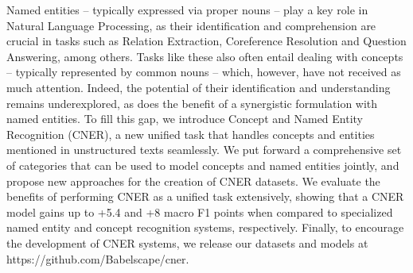 Named entities -- typically expressed via proper nouns -- play a key role in Natural Language Processing, as their identification and comprehension are crucial in tasks such as Relation Extraction, Coreference Resolution and Question Answering, among others. Tasks like these also often entail dealing with concepts -- typically represented by common nouns -- which, however, have not received as much attention. Indeed, the potential of their identification and understanding remains underexplored, as does the benefit of a synergistic formulation with named entities. To fill this gap, we introduce Concept and Named Entity Recognition (CNER), a new unified task that handles concepts and entities mentioned in unstructured texts seamlessly. We put forward a comprehensive set of categories that can be used to model concepts and named entities jointly, and propose new approaches for the creation of CNER datasets. We evaluate the benefits of performing CNER as a unified task extensively, showing that a CNER model gains up to +5.4 and +8 macro F1 points when compared to specialized named entity and concept recognition systems, respectively. Finally, to encourage the development of CNER systems, we release our datasets and models at https://github.com/Babelscape/cner.